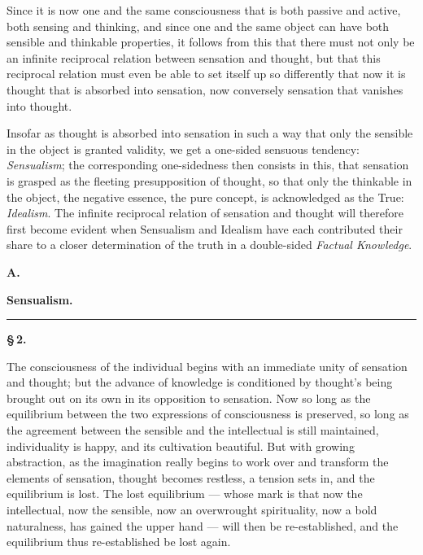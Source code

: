 \documentclass[12pt]{book}
\begin{document}
Since it is now one and the same consciousness that is both passive and active,
both sensing and thinking, and since one and the same object can have both
sensible and
thinkable properties, it follows from this that there must not only be an
infinite reciprocal relation between sensation and thought, but that this
reciprocal relation must even be able to set itself up so differently that now
it is thought that is absorbed into sensation, now conversely sensation that
vanishes into thought.

Insofar as thought is absorbed into sensation in such a way that only the
sensible in the object is granted validity, we get a one-sided sensuous
tendency: \emph{Sensualism}; the corresponding one-sidedness then consists in
this, that sensation is grasped as the fleeting presupposition of thought, so
that only the thinkable in the object, the negative essence, the pure concept,
is acknowledged as the True: \emph{Idealism}. The infinite reciprocal relation
of sensation and thought will therefore first become evident when Sensualism and
Idealism have each contributed their share to a closer determination of the
truth in a double-sided \emph{Factual Knowledge}.

\begin{center}
  {\large\bfseries A.}\par\vspace{2pt}
  {\bfseries Sensualism.}\par\vspace{4pt}
  \rule{2cm}{0.4pt}
\end{center}
{}

\begin{center}{\bfseries \S\,2.}\end{center}

\noindent The consciousness of the individual begins with an immediate unity of
sensation and thought; but the advance of knowledge is conditioned by thought's
being brought out on its own in its opposition to sensation. Now so long as the
equilibrium between the two expressions of consciousness is preserved, so long as
the agreement between the sensible and the intellectual is still maintained,
individuality is happy, and its cultivation beautiful. But with growing
abstraction, as the imagination really begins to work over and transform
the elements of sensation, thought becomes restless, a tension sets in, and the
equilibrium is lost. The lost equilibrium --- whose mark is that now the
intellectual, now the sensible, now an overwrought spirituality, now a bold
naturalness, has gained the upper hand --- will then be re-established, and the
equilibrium thus re-established be lost again.
\end{document}
